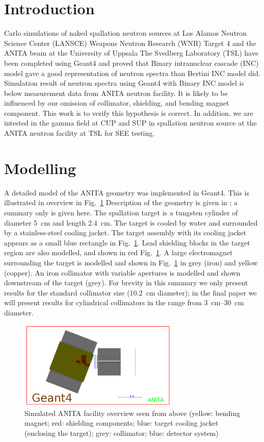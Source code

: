 \documentclass[11pt,a4paper]{IEEEtran}
\let\MYoriglatexcaption\caption
\renewcommand{\caption}[2][\relax]{\MYoriglatexcaption[#2]{#2}}
\begin{document}
\section{Introduction}
 Carlo simulations of naked spallation neutron sources at Los Alamos Neutron Science Center (LANSCE) Weapons Neutron Research (WNR) Target 4\cite{Wender87} and the ANITA beam at the University of Uppsala The Svedberg Laboratory (TSL) have been completed using Geant4 and proved that Binary intranuclear cascade (INC) model gave a good representation of neutron spectra than Bertini INC model did\cite{Platt13}. Simulation result of neutron spectra using Geant4 with Binary INC model is below measurement data from ANITA neutron facility. It is likely to be influenced by our omission of collimator, shielding, and bending magnet component. This work is to verify this hypothesis is correct. In addition, we are intested in the gamma field at CUP and SUP in spallation neutron source at the ANITA neutron facility at TSL for SEE testing.

\section{Modelling}

A detailed model of the ANITA geometry was implemented in Geant4.
This is illustrated in overview in Fig.~\ref{fig:ANITAoverview}
Description of the geometry is given in \cite{Prokofiev2009,Prokofiev14}; a summary only is given here.
The spallation target is a tungsten cylinder of diameter \SI{5}{\cm} and length \SI{2.4}{\cm}.
The target is cooled by water and surrounded by a stainless-steel cooling jacket.
The target assembly with its cooling jacket appears as a small blue rectangle in Fig.~\ref{fig:ANITAoverview}.
Lead shielding blocks in the target region are also modelled, and shown in red Fig.~\ref{fig:ANITAoverview}.
A large electromagnet surrounding the target is modelled and shown in Fig.~\ref{fig:ANITAoverview} in grey (iron) and yellow (copper).
An iron collimator with variable apertures is modelled  and shown downstream of the target (grey).
For brevity in this summary we only present results for the standard collimator size (\SI{10.2}{\cm} diameter); in the final paper we will present results for cylindrical collimators in the range from \SIrange{3}{30}{\cm} diameter.

\begin{figure}[!t]
	\centering
	\includegraphics[width=3in]{overview.png}
	\caption{Simulated ANITA facility overview seen from above (yellow: bending magnet; red: shielding components; blue: target cooling jacket (enclosing the target); grey: collimator; blue: detector system)}
	\label{fig:ANITAoverview}
\end{figure}
\end{document}
